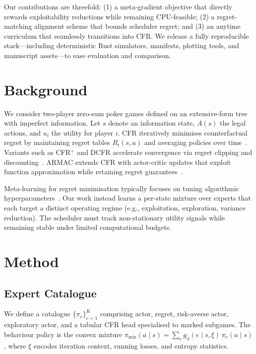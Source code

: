 \documentclass{icml2024}
\begin{document}
Our contributions are threefold: (1) a meta-gradient objective that directly rewards exploitability reductions while remaining CPU-feasible; (2) a regret-matching alignment scheme that bounds scheduler regret; and (3) an anytime curriculum that seamlessly transitions into CFR. We release a fully reproducible stack—including deterministic Rust simulators, manifests, plotting tools, and manuscript assets—to ease evaluation and comparison.

\section{Background}
We consider two-player zero-sum poker games defined on an extensive-form tree with imperfect information. Let $s$ denote an information state, $A(s)$ the legal actions, and $u_i$ the utility for player $i$. CFR iteratively minimises counterfactual regret by maintaining regret tables $R_t(s,a)$ and averaging policies over time~\citep{zinkevich2007regret}. Variants such as CFR$^+$ and DCFR accelerate convergence via regret clipping and discounting~\citep{tammelin2014solving,brown2019deep}. ARMAC extends CFR with actor-critic updates that exploit function approximation while retaining regret guarantees~\citep{heinrich2016counterfactual}.

Meta-learning for regret minimisation typically focuses on tuning algorithmic hyperparameters~\citep{metaCFR2022,anil2021learning}. Our work instead learns a per-state mixture over experts that each target a distinct operating regime (e.g., exploitation, exploration, variance reduction). The scheduler must track non-stationary utility signals while remaining stable under limited computational budgets.

\section{Method}
\subsection{Expert Catalogue}
We define a catalogue $\{\pi_e\}_{e=1}^{K}$ comprising actor, regret, risk-averse actor, exploratory actor, and a tabular CFR head specialised to marked subgames. The behaviour policy is the convex mixture $\pi_{\text{mix}}(a\mid s) = \sum_{e} g_\phi(e\mid s,\xi)\,\pi_e(a\mid s)$, where $\xi$ encodes iteration context, running losses, and entropy statistics.
\end{document}
